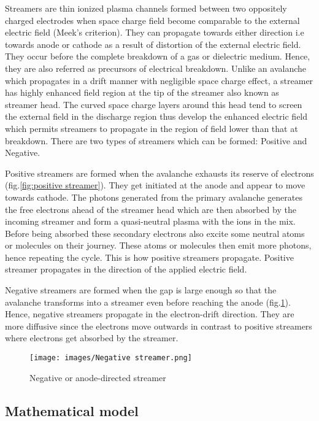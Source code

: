\documentclass[paper=a4, fontsize=13pt]{scrartcl}
\begin{document}
Streamers are thin ionized plasma channels formed between two oppositely charged electrodes when space charge field become comparable to the external electric field (Meek's criterion). They can propagate towards either direction i.e towards anode or cathode as a result of distortion of the external electric field. They occur before the complete breakdown of a gas or dielectric medium. Hence, they are also referred as precursors of electrical breakdown. Unlike an avalanche which propagates in a drift manner with negligible space charge effect, a streamer has highly enhanced field region at the tip of the streamer also known as streamer head. The curved space charge layers around this head tend to screen the external field in the discharge region thus develop the enhanced electric field which permits streamers to propagate in the region of field lower than that at breakdown. There are two types of streamers which can be formed: Positive and Negative. 


Positive streamers are formed when the avalanche exhausts its reserve of electrons (fig.\ref{fig:positive streamer}). They get initiated at the anode and appear to move towards cathode. The photons generated from the primary avalanche generates the free electrons ahead of the streamer head which are then absorbed by the incoming streamer and form a quasi-neutral plasma with the ions in the mix. Before being absorbed these secondary electrons also excite some neutral atoms or molecules on their journey. These atoms or molecules then emit more photons, hence repeating the cycle. This is how positive streamers propagate. Positive streamer propagates in the direction of the applied electric field. 

Negative streamers are formed when the gap is large enough so that the avalanche transforms into a streamer even before reaching the anode (fig.\ref{fig:Negative streamer}). Hence, negative streamers propagate in the electron-drift direction. They are more diffusive since the electrons move outwards in contrast to positive streamers where electrons get absorbed by the streamer.    

\begin{figure}
\centering
\texttt{[image: images/Negative streamer.png]}
 \caption{Negative or anode-directed streamer \cite{Raizer1991GasRazryada}}
  \label{fig:Negative streamer}
\end{figure}

\subsection{Mathematical model}  
      
\end{document}
